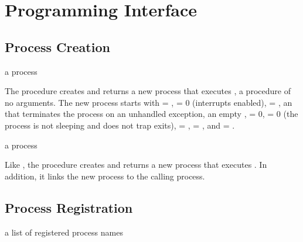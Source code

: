 \section {Programming Interface}\label{sec:erlang-api}

\subsection {Process Creation}

\begin{procedure}
\end{procedure}
\returns{} a process

The  procedure creates and returns a new process that
executes , a procedure of no arguments. The new process
starts with  = ,  = 0 (interrupts
enabled),  = \code{()}, an 
that terminates the process on an unhandled exception, an empty
,  = 0,  = 0 (the
process is not sleeping and does not trap exits),  =
\code{()},  = \code{()}, and  =
.

\begin{procedure}
\end{procedure}
\returns{} a process

Like , the  procedure creates and
returns a new process that executes . In addition, it links
the new process to the calling process.

\subsection {Process Registration}

\begin{procedure}
\end{procedure}
\returns{} a list of registered process names


